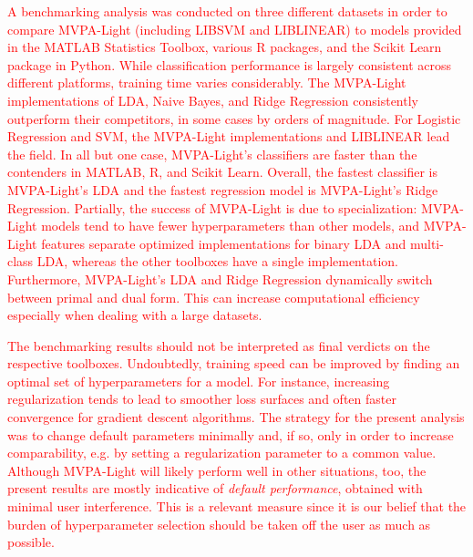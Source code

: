 \documentclass[utf8]{frontiersSCNS} %
\newcommand{\red}[1]{\textcolor{red}{#1}}
\begin{document}
\red{A benchmarking analysis was conducted on three different datasets in order to compare MVPA-Light (including LIBSVM and LIBLINEAR) to models provided in the MATLAB Statistics Toolbox, various R packages, and the Scikit Learn package in Python. While classification performance is largely consistent across different platforms, training time varies considerably. The MVPA-Light implementations of LDA, Naive Bayes, and Ridge Regression consistently outperform  their competitors, in some cases by orders of magnitude. For Logistic Regression and SVM, the MVPA-Light implementations and LIBLINEAR lead the field. In all but one case, MVPA-Light's classifiers are faster than the contenders in MATLAB, R, and Scikit Learn. Overall, the fastest classifier is MVPA-Light's LDA and the fastest regression model is MVPA-Light's Ridge Regression. Partially, the success of MVPA-Light is due to specialization: MVPA-Light models tend to have fewer hyperparameters than other models, and MVPA-Light features separate optimized implementations for binary LDA and multi-class LDA, whereas the other toolboxes have a single implementation. Furthermore, MVPA-Light's LDA and Ridge Regression dynamically switch between primal and dual form. This can increase computational efficiency especially when dealing with a large datasets.}

\red{The benchmarking results should not be interpreted as final verdicts on the respective toolboxes. 
 Undoubtedly, training speed can be improved by finding an optimal set of hyperparameters for a model. For instance, increasing regularization tends to lead to smoother loss surfaces and often faster convergence for gradient descent algorithms. The strategy for the present analysis was to change default parameters minimally and, if so, only in order to increase comparability, e.g. by setting a regularization parameter to a common value. 
 Although MVPA-Light will likely perform well in other situations, too, the present results are mostly indicative of \textit{default performance}, obtained with minimal user interference. This is a relevant measure since it is our belief that the burden of hyperparameter selection should be taken off the user as much as possible.}


\end{document}
